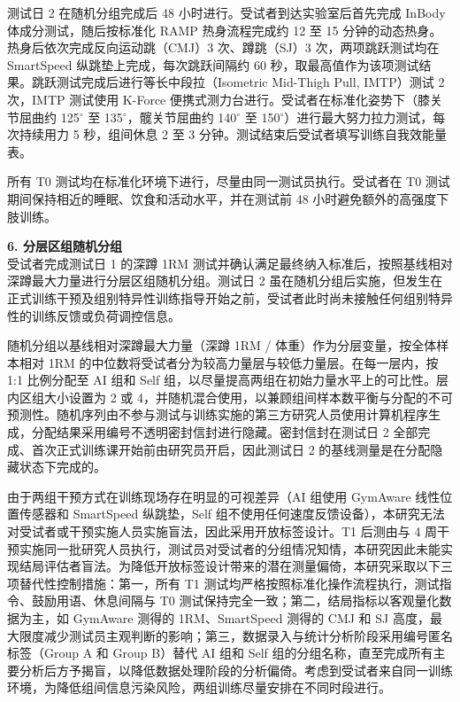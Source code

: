 \documentclass[UTF8,zihao=-4,twoside,openany]{ctexbook}
\begin{document}
测试日 2 在随机分组完成后 48 小时进行。受试者到达实验室后首先完成 InBody 体成分测试，随后按标准化 RAMP 热身流程完成约 12 至 15 分钟的动态热身。热身后依次完成反向运动跳（CMJ）3 次、蹲跳（SJ）3 次，两项跳跃测试均在 SmartSpeed 纵跳垫上完成，每次跳跃间隔约 60 秒，取最高值作为该项测试结果。跳跃测试完成后进行等长中段拉（Isometric Mid-Thigh Pull, IMTP）测试 2 次，IMTP 测试使用 K-Force 便携式测力台进行。受试者在标准化姿势下（膝关节屈曲约 125$^\circ$ 至 135$^\circ$，髋关节屈曲约 140$^\circ$ 至 150$^\circ$）进行最大努力拉力测试，每次持续用力 5 秒，组间休息 2 至 3 分钟。测试结束后受试者填写训练自我效能量表。

所有 T0 测试均在标准化环境下进行，尽量由同一测试员执行。受试者在 T0 测试期间保持相近的睡眠、饮食和活动水平，并在测试前 48 小时避免额外的高强度下肢训练。

\vspace{0.2cm}
\noindent \textbf{6. 分层区组随机分组} \\
受试者完成测试日 1 的深蹲 1RM 测试并确认满足最终纳入标准后，按照基线相对深蹲最大力量进行分层区组随机分组。测试日 2 虽在随机分组后实施，但发生在正式训练干预及组别特异性训练指导开始之前，受试者此时尚未接触任何组别特异性的训练反馈或负荷调控信息。

随机分组以基线相对深蹲最大力量（深蹲 1RM / 体重）作为分层变量，按全体样本相对 1RM 的中位数将受试者分为较高力量层与较低力量层。在每一层内，按 1:1 比例分配至 AI 组和 Self 组，以尽量提高两组在初始力量水平上的可比性。层内区组大小设置为 2 或 4，并随机混合使用，以兼顾组间样本数平衡与分配的不可预测性。随机序列由不参与测试与训练实施的第三方研究人员使用计算机程序生成，分配结果采用编号不透明密封信封进行隐藏。密封信封在测试日 2 全部完成、首次正式训练课开始前由研究员开启，因此测试日 2 的基线测量是在分配隐藏状态下完成的。

由于两组干预方式在训练现场存在明显的可视差异（AI 组使用 GymAware 线性位置传感器和 SmartSpeed 纵跳垫，Self 组不使用任何速度反馈设备），本研究无法对受试者或干预实施人员实施盲法，因此采用开放标签设计。T1 后测由与 4 周干预实施同一批研究人员执行，测试员对受试者的分组情况知情，本研究因此未能实现结局评估者盲法。为降低开放标签设计带来的潜在测量偏倚，本研究采取以下三项替代性控制措施：第一，所有 T1 测试均严格按照标准化操作流程执行，测试指令、鼓励用语、休息间隔与 T0 测试保持完全一致；第二，结局指标以客观量化数据为主，如 GymAware 测得的 1RM、SmartSpeed 测得的 CMJ 和 SJ 高度，最大限度减少测试员主观判断的影响；第三，数据录入与统计分析阶段采用编号匿名标签（Group A 和 Group B）替代 AI 组和 Self 组的分组名称，直至完成所有主要分析后方予揭盲，以降低数据处理阶段的分析偏倚。考虑到受试者来自同一训练环境，为降低组间信息污染风险，两组训练尽量安排在不同时段进行。
\end{document}
